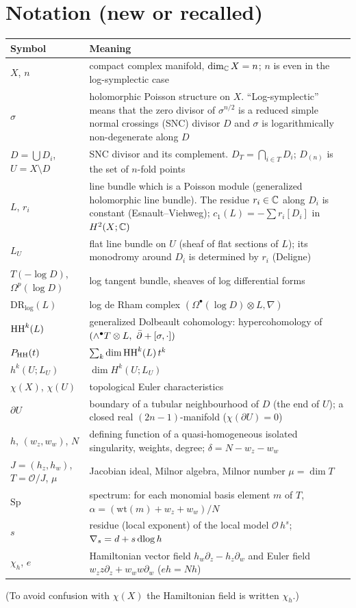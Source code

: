 \section{Notation (new or recalled)}\label{p5:sec:notation}
\begin{longtable}{>{\raggedright\arraybackslash}p{3.8cm}>{\raggedright\arraybackslash}p{11.2cm}}
\toprule Symbol & Meaning\\ \midrule\endhead
$X$, $n$ & compact complex manifold, $\dim_\mathbb C X=n$; $n$ is even in the log-symplectic case\\
$\sigma$ & holomorphic Poisson structure on $X$. ``Log-symplectic'' means that the zero divisor of $\sigma^{n/2}$ is a reduced simple normal crossings (SNC) divisor $D$ and $\sigma$ is logarithmically non-degenerate along $D$\\
$D=\bigcup D_i$, $U=X\setminus D$ & SNC divisor and its complement. $D_T=\bigcap_{i\in T}D_i$; $D_{(n)}$ is the set of $n$-fold points\\
$L$, $r_i$ & line bundle which is a Poisson module (generalized holomorphic line bundle). The residue $r_i\in\mathbb C$ along $D_i$ is constant (Esnault--Viehweg); $c_1(L)=-\sum r_i[D_i]$ in $H^2(X;\mathbb C)$\\
$L_U$ & flat line bundle on $U$ (sheaf of flat sections of $L$); its monodromy around $D_i$ is determined by $r_i$ (Deligne)\\
$T(-\log D)$, $\Omega^p(\log D)$ & log tangent bundle, sheaves of log differential forms\\
$\mathrm{DR}_{\log}(L)$ & log de Rham complex $(\Omega^\bullet(\log D)\otimes L,\nabla)$\\
$\mathrm{HH}^k(L)$ & generalized Dolbeault cohomology: hypercohomology of $(\wedge^\bullet T\otimes L,\ \bar\partial+[\sigma,\cdot])$\\
$P_{\mathrm{HH}}(t)$ & $\sum_k\dim\mathrm{HH}^k(L)\,t^k$\\
$h^k(U;L_U)$ & $\dim H^k(U;L_U)$\\
$\chi(X)$, $\chi(U)$ & topological Euler characteristics\\
$\partial U$ & boundary of a tubular neighbourhood of $D$ (the end of $U$); a closed real $(2n-1)$-manifold ($\chi(\partial U)=0$)\\
$h$, $(w_z,w_w)$, $N$ & defining function of a quasi-homogeneous isolated singularity, weights, degree; $\delta=N-w_z-w_w$\\
$J=(h_z,h_w)$, $T=\mathcal O/J$, $\mu$ & Jacobian ideal, Milnor algebra, Milnor number $\mu=\dim T$\\
$\mathrm{Sp}$ & spectrum: for each monomial basis element $m$ of $T$, $\alpha=(\mathrm{wt}(m)+w_z+w_w)/N$\\
$s$ & residue (local exponent) of the local model $\mathcal O\,h^s$; $\nabla_s=d+s\,\mathrm{dlog}\, h$\\
$\chi_h$, $e$ & Hamiltonian vector field $h_w\partial_z-h_z\partial_w$ and Euler field $w_zz\partial_z+w_ww\partial_w$ ($e h=Nh$)\\
\bottomrule
\end{longtable}
(To avoid confusion with $\chi(X)$ the Hamiltonian field is written $\chi_h$.)

